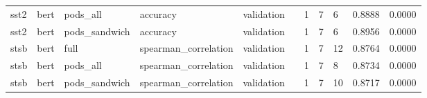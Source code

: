 \begin{tabular}{lllllllllll}
sst2 & bert & pods\_all & accuracy & validation &  & 1 & 7 & 6 & 0.8888 & 0.0000 \\
sst2 & bert & pods\_sandwich & accuracy & validation &  & 1 & 7 & 6 & 0.8956 & 0.0000 \\
stsb & bert & full & spearman\_correlation & validation &  & 1 & 7 & 12 & 0.8764 & 0.0000 \\
stsb & bert & pods\_all & spearman\_correlation & validation &  & 1 & 7 & 8 & 0.8734 & 0.0000 \\
stsb & bert & pods\_sandwich & spearman\_correlation & validation &  & 1 & 7 & 10 & 0.8717 & 0.0000 \\
\hline
\end{tabular}
